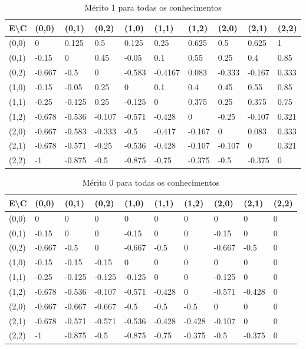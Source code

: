 \documentclass[preprint,12pt]{elsarticle}
\begin{document}
\begin{table}[htp]
\caption{Mérito 1 para todas os conhecimentos}
\label{table:merit-1-all}
\centering
\begin{tabular}{@{}llllllllll@{}}
\toprule
E\textbackslash C & (0,0) & (0,1) & (0,2) & (1,0) & (1,1) & (1,2) & (2,0) & (2,1) & (2,2) \\ \midrule
(0,0) & 0  & 0.125  & 0.5  & 0.125  & 0.25  & 0.625  & 0.5  & 0.625  & 1 \\
(0,1) & -0.15  & 0  & 0.45  & -0.05  & 0.1  & 0.55  & 0.25  & 0.4  & 0.85 \\
(0,2) & -0.667  & -0.5  & 0  & -0.583  & -0.4167  & 0.083  & -0.333  & -0.167  & 0.333 \\
(1,0) & -0.15  & -0.05  & 0.25  & 0  & 0.1  & 0.4  & 0.45  & 0.55  & 0.85 \\
(1,1) & -0.25  & -0.125  & 0.25  & -0.125  & 0  & 0.375  & 0.25  & 0.375  & 0.75 \\
(1,2) & -0.678  & -0.536  & -0.107  & -0.571  & -0.428  & 0  & -0.25  & -0.107  & 0.321 \\
(2,0) & -0.667  & -0.583  & -0.333  & -0.5  & -0.417  & -0.167  & 0  & 0.083  & 0.333 \\ 
(2,1) & -0.678  & -0.571  & -0.25  & -0.536  & -0.428  & -0.107  & -0.107  & 0  & 0.321 \\
(2,2) & -1  & -0.875  & -0.5  & -0.875  & -0.75  & -0.375  & -0.5  & -0.375  & 0 \\ \bottomrule
\end{tabular}
\end{table}

\newpage

\begin{table}[htp]
\caption{Mérito 0 para todas os conhecimentos}
\label{table:merit-0-all}
\centering
\begin{tabular}{@{}llllllllll@{}}
\toprule
E\textbackslash C & (0,0) & (0,1) & (0,2) & (1,0) & (1,1) & (1,2) & (2,0) & (2,1) & (2,2) \\ \midrule
(0,0) & 0  & 0  & 0  & 0  & 0  & 0  & 0  & 0  & 0 \\
(0,1) & -0.15  & 0  & 0  & -0.15  & 0  & 0  & -0.15  & 0  & 0 \\
(0,2) & -0.667  & -0.5  & 0  & -0.667  & -0.5  & 0  & -0.667  & -0.5  & 0 \\
(1,0) & -0.15  & -0.15  & -0.15  & 0  & 0  & 0  & 0  & 0  & 0 \\
(1,1) & -0.25  & -0.125  & -0.125  & -0.125  & 0  & 0  & -0.125  & 0  & 0 \\
(1,2) & -0.678  & -0.536  & -0.107  & -0.571  & -0.428  & 0  & -0.571  & -0.428  & 0 \\
(2,0) & -0.667  & -0.667  & -0.667  & -0.5  & -0.5  & -0.5  & 0  & 0  & 0 \\
(2,1) & -0.678  & -0.571  & -0.571  & -0.536  & -0.428  & -0.428  & -0.107  & 0  & 0 \\
(2,2) & -1  & -0.875  & -0.5  & -0.875  & -0.75  & -0.375  & -0.5  & -0.375  & 0 \\ \bottomrule
\end{tabular}
\end{table}
\end{document}
